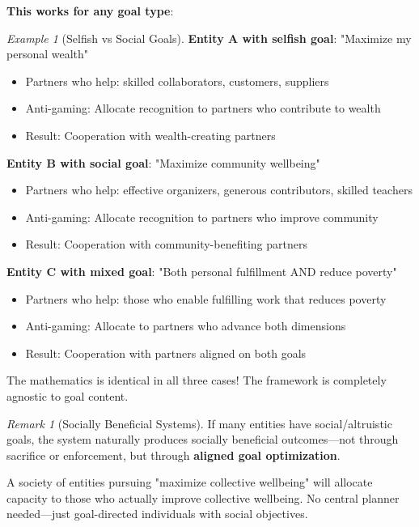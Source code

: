 \documentclass[11pt,a4paper]{article}
\theoremstyle{definition}
\theoremstyle{remark}
\newtheorem{remark}[theorem]{Remark}
\newtheorem{example}[theorem]{Example}
\begin{document}
\textbf{This works for any goal type}:

\begin{example}[Selfish vs Social Goals]
\textbf{Entity A with selfish goal}: "Maximize my personal wealth"
\begin{itemize}
\item Partners who help: skilled collaborators, customers, suppliers
\item Anti-gaming: Allocate recognition to partners who contribute to wealth
\item Result: Cooperation with wealth-creating partners
\end{itemize}

\textbf{Entity B with social goal}: "Maximize community wellbeing"
\begin{itemize}
\item Partners who help: effective organizers, generous contributors, skilled teachers
\item Anti-gaming: Allocate recognition to partners who improve community
\item Result: Cooperation with community-benefiting partners
\end{itemize}

\textbf{Entity C with mixed goal}: "Both personal fulfillment AND reduce poverty"
\begin{itemize}
\item Partners who help: those who enable fulfilling work that reduces poverty
\item Anti-gaming: Allocate to partners who advance both dimensions
\item Result: Cooperation with partners aligned on both goals
\end{itemize}

The mathematics is identical in all three cases! The framework is completely agnostic to goal content.
\end{example}

\begin{remark}[Socially Beneficial Systems]
If many entities have social/altruistic goals, the system naturally produces socially beneficial outcomes—not through sacrifice or enforcement, but through \textbf{aligned goal optimization}.

A society of entities pursuing "maximize collective wellbeing" will allocate capacity to those who actually improve collective wellbeing. No central planner needed—just goal-directed individuals with social objectives.
\end{remark}
\end{document}
